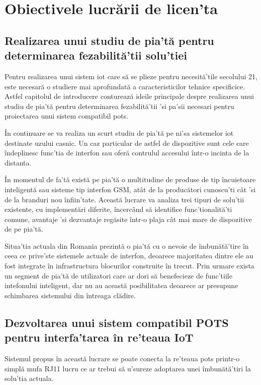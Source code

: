 \section {Obiectivele lucrării de licen'ta}

\subsection {Realizarea unui studiu de pia'tă pentru determinarea fezabilită'tii solu'tiei}

Pentru realizarea unui sistem \acrfull{iot} care să se plieze pentru necesită'tile secolului 21, este necesară o studiere mai aprofundată a caracteristicilor tehnice specificice. Astfel capitolul de introducere conturează ideile principale despre realizarea unui studiu de pia'tă pentru determinarea fezabilită'tii 'si pa'sii necesari pentru proiectarea unui sistem compatibil \acrshort{pots}.

În continuare se va realiza un scurt studiu de pia'tă pe ni'sa sistemelor \acrshort{iot} destinate uzului casnic. Un caz particular de astfel de dispozitive sunt cele care îndeplinesc func'tia de interfon sau oferă contrulul accesului într-o incinta de la distanta.

În momentul de fa'tă există pe pia'tă o multitudine de produse de tip încuietoare inteligentă sau sisteme tip interfon GSM, atât de la producători cunoscu'ti cât 'si de la branduri nou înfiin'tate. Această lucrare va analiza trei tipuri de solu'tii existente, cu implementări diferite, încercând să identifice func'tionalită'ti comune, avantaje 'si dezvantaje regăsite într-o plaja cât mai mare de dispozitive de pe pia'tă.

Situa'tia actuala din Romania prezintă o pia'tă cu o nevoie de îmbunătă'tire în ceea ce prive'ste sistemele actuale de interfon, deoarece majoritatea dintre ele au fost integrate în infrastructura blocurilor construite în trecut. Prin urmare exista un segment de pia'tă de utilizatori care ar dori să benefecieze de func'tiile intefonului inteligent, dar nu au această posibilitatea deoarece ar presupune schimbarea sistemului din întreaga clădire.


\subsection {Dezvoltarea unui sistem compatibil POTS pentru interfa'tarea în re'teaua IoT}

Sistemul propus în această lucrare se poate conecta la re'teaua \acrfull{pots} printr-o simplă mufa RJ11 lucru ce ar trebui să u'sureze adoptarea unei îmbunătă'tiri la solu'tia actuala.


